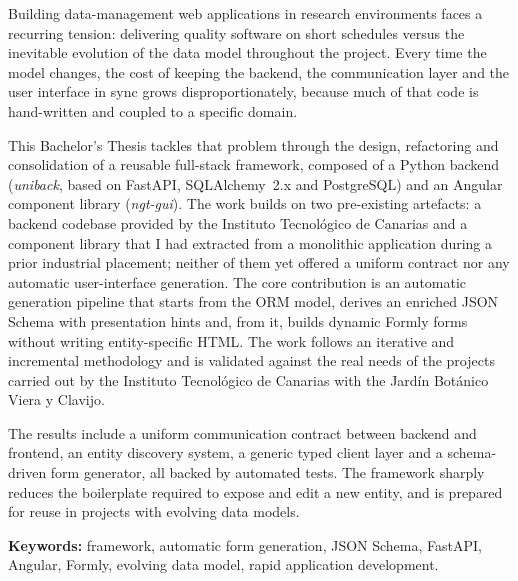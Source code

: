 {Building data-management web applications in research environments faces a
recurring tension: delivering quality software on short schedules versus the
inevitable evolution of the data model throughout the project. Every time the
model changes, the cost of keeping the backend, the communication layer and
the user interface in sync grows disproportionately, because much of that code
is hand-written and coupled to a specific domain.

This Bachelor's Thesis tackles that problem through the design, refactoring and
consolidation of a reusable full-stack framework, composed of a Python backend
(\emph{uniback}, based on FastAPI, SQLAlchemy~2.x and PostgreSQL) and an
Angular component library (\emph{ngt-gui}). The work builds on two pre-existing
artefacts: a backend codebase provided by the Instituto Tecnológico de Canarias
and a component library that I had extracted from a monolithic application
during a prior industrial placement; neither of them yet offered a
uniform contract nor any automatic user-interface generation. The core
contribution is an
automatic generation pipeline that starts from the ORM model, derives an
enriched JSON Schema with presentation hints and, from it, builds dynamic
Formly forms without writing entity-specific HTML. The work follows an
iterative and incremental methodology and is validated against the real needs
of the projects carried out by the Instituto Tecnológico de Canarias with the
Jardín Botánico Viera y Clavijo.

The results include a uniform communication contract between backend and
frontend, an entity discovery system, a generic typed client layer and a
schema-driven form generator, all backed by automated tests. The framework
sharply reduces the boilerplate required to expose and edit a new entity, and
is prepared for reuse in projects with evolving data models.

\textbf{Keywords:} framework, automatic form generation, JSON Schema, FastAPI,
Angular, Formly, evolving data model, rapid application development.

}
